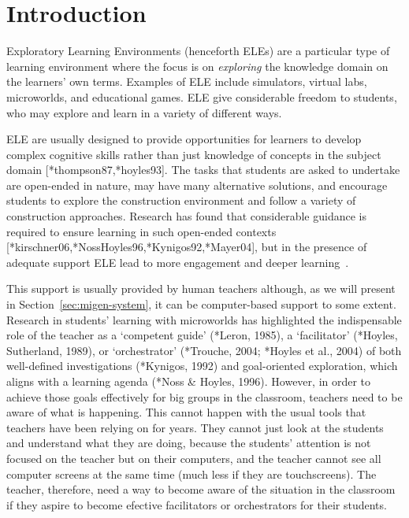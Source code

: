 \section{Introduction}
\label{sec:introduction}

Exploratory Learning Environments (henceforth ELEs) are a particular
type of learning environment where the focus is on \emph{exploring}
the knowledge domain on the learners' own terms. Examples of ELE
include simulators, virtual labs, microworlds, and educational
games. ELE give considerable freedom to students, who may explore and
learn in a variety of different ways.

ELE are usually designed to provide opportunities for learners to
develop complex 
cognitive skills rather than just knowledge of concepts in the subject
domain [*thompson87,*hoyles93]. The tasks that students are asked to
undertake are open-ended in nature, may have many alternative
solutions, and encourage students to explore the construction
environment and follow a variety of construction approaches. Research
has found that considerable guidance is required to ensure learning in
such open-ended contexts [*kirschner06,*NossHoyles96,*Kynigos92,*Mayer04],
but in the presence of adequate support ELE lead to more engagement
and deeper learning~\cite{deeperLearning}. 

This support is usually provided by human teachers although, as we
will present in Section~\ref{sec:migen-system}, it can be
computer-based support to some extent.
Research in students’ learning with microworlds has highlighted
the indispensable role of the teacher as a ‘competent guide’ (*Leron,
1985), a ‘facilitator’ (*Hoyles, Sutherland, 1989), or ‘orchestrator’
(*Trouche, 2004; *Hoyles et al., 2004) of both well-defined
investigations (*Kynigos, 1992) and goal-oriented exploration, which
aligns with a learning agenda (*Noss \& Hoyles, 1996). However, in
order to achieve those goals effectively for big groups in the
classroom, teachers need to be aware of what is happening. This cannot
happen with the usual tools that teachers have been relying on for
years. They cannot just look at the students and understand what they
are doing, because the students' attention is not focused on the
teacher but on their computers, and the teacher cannot see all
computer screens at the same time (much less if they are
touchscreens). The teacher, therefore, need a way to become aware of
the situation in the classroom if they aspire to become efective
facilitators or orchestrators for their students. 

